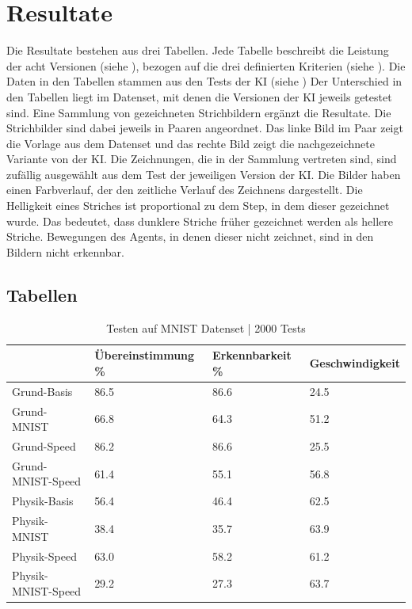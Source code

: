 \chapter{Resultate}
\label{chap:r}
Die Resultate bestehen aus drei Tabellen. Jede Tabelle beschreibt die Leistung
der acht Versionen (siehe ), bezogen auf die drei definierten
Kriterien (siehe ). Die Daten in den Tabellen
stammen aus den Tests der KI (siehe )
Der Unterschied in den Tabellen liegt im Datenset, mit denen die Versionen der
KI jeweils getestet sind. 
Eine Sammlung von gezeichneten Strichbildern ergänzt die Resultate. Die
Strichbilder sind dabei jeweils in Paaren angeordnet. Das linke Bild im Paar
zeigt die Vorlage aus dem Datenset und das rechte Bild zeigt die nachgezeichnete
Variante von der KI. Die Zeichnungen, die in der Sammlung
vertreten sind, sind zufällig ausgewählt aus dem Test der jeweiligen Version der
KI. Die Bilder haben einen Farbverlauf, der den zeitliche
Verlauf des Zeichnens dargestellt. Die Helligkeit eines Striches ist
proportional zu dem Step, in dem dieser gezeichnet wurde. Das bedeutet, dass
dunklere Striche früher gezeichnet werden als hellere Striche. Bewegungen des
Agents, in denen dieser nicht zeichnet, sind in den Bildern nicht erkennbar.

\newpage
\section{Tabellen}
\label{chap:r_tab}
\begin{table}[!ht]
    \centering
    \caption{Testen auf MNIST Datenset | 2000 Tests}
    \begin{tabular}{|l|l|l|l|}
        \hline
            ~ & Übereinstimmung \% & Erkennbarkeit \% & Geschwindigkeit \\ \hline
            Grund-Basis & 86.5 & 86.6 & 24.5 \\ \hline
            Grund-MNIST & 66.8 & 64.3 & 51.2 \\ \hline
            Grund-Speed & 86.2 & 86.6 & 25.5 \\ \hline
            Grund-MNIST-Speed & 61.4 & 55.1 & 56.8 \\ \hline
            Physik-Basis & 56.4 & 46.4 & 62.5 \\ \hline
            Physik-MNIST & 38.4 & 35.7 & 63.9 \\ \hline
            Physik-Speed & 63.0 & 58.2 & 61.2 \\ \hline
            Physik-MNIST-Speed & 29.2 & 27.3 & 63.7 \\ \hline
        \end{tabular}
    \label{tab:MNIST}
\end{table}

